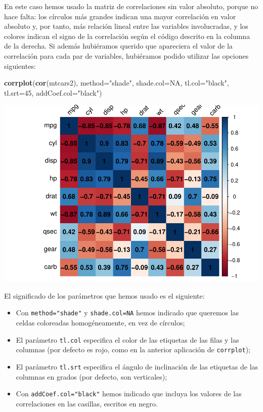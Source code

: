 \documentclass[
]{book}
\newenvironment{Shaded}{\begin{snugshade}}{\end{snugshade}}
\newcommand{\DataTypeTok}[1]{\textcolor[rgb]{0.13,0.29,0.53}{#1}}
\newcommand{\DecValTok}[1]{\textcolor[rgb]{0.00,0.00,0.81}{#1}}
\newcommand{\KeywordTok}[1]{\textcolor[rgb]{0.13,0.29,0.53}{\textbf{#1}}}
\newcommand{\NormalTok}[1]{#1}
\newcommand{\OtherTok}[1]{\textcolor[rgb]{0.56,0.35,0.01}{#1}}
\newcommand{\StringTok}[1]{\textcolor[rgb]{0.31,0.60,0.02}{#1}}
\providecommand{\tightlist}{%
  \setlength{\itemsep}{0pt}\setlength{\parskip}{0pt}}
\theoremstyle{definition}
\theoremstyle{definition}
\theoremstyle{definition}
\theoremstyle{remark}
\begin{document}
En este caso hemos usado la matriz de correlaciones sin valor absoluto, porque no hace falta: los círculos más grandes indican una mayor correlación en valor absoluto y, por tanto, más relación lineal entre las variables involucradas, y los colores indican el signo de la correlación según el código descrito en la columna de la derecha.
Si además hubiéramos querido que apareciera el valor de la correlación para cada par de variables, hubiéramos podido utilizar las opciones siguientes:

\begin{Shaded}
\begin{Highlighting}[]
\KeywordTok{corrplot}\NormalTok{(}\KeywordTok{cor}\NormalTok{(mtcars2), }\DataTypeTok{method=}\StringTok{"shade"}\NormalTok{, }\DataTypeTok{shade.col=}\OtherTok{NA}\NormalTok{, }
   \DataTypeTok{tl.col=}\StringTok{"black"}\NormalTok{, }\DataTypeTok{tl.srt=}\DecValTok{45}\NormalTok{, }\DataTypeTok{addCoef.col=}\StringTok{"black"}\NormalTok{)}
\end{Highlighting}
\end{Shaded}

\begin{center}\includegraphics[width=0.9\linewidth]{14cap13_EDextra_files/figure-latex/unnamed-chunk-14-1} \end{center}

El significado de los parámetros que hemos usado es el siguiente:

\begin{itemize}
\tightlist
\item
  Con \texttt{method="shade"} y \texttt{shade.col=NA} hemos indicado que queremos las celdas coloreadas homogéneamente, en vez de círculos;
\item
  El parámetro \texttt{tl.col} especifica el color de las etiquetas de las filas y las columnas (por defecto es rojo, como en la anterior aplicación de \texttt{corrplot});\\
\item
  El parámetro \texttt{tl.srt} especifica el ángulo de inclinación de las etiquetas de las columnas en grados (por defecto, son verticales);
\item
  Con \texttt{addCoef.col="black"} hemos indicado que incluya los valores de las correlaciones en las casillas, escritos en negro.
\end{itemize}
\end{document}
